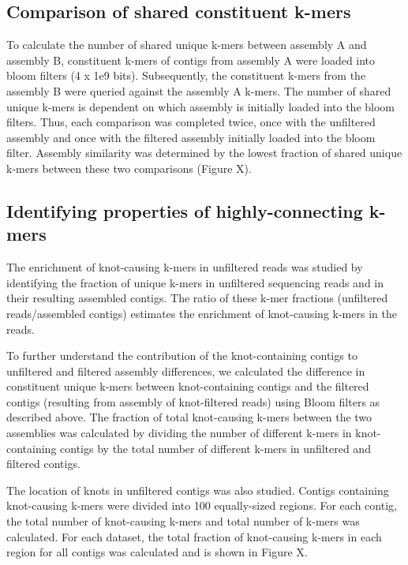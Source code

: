 \documentclass[11pt]{article} %
\begin{document}
\subsection{Comparison of shared constituent k-mers}

To calculate the number of shared unique k-mers between assembly A and assembly B, constituent k-mers of contigs from assembly A were loaded into bloom filters (4 x 1e9 bits). Subsequently, the constituent k-mers from the assembly B were queried against
the assembly A k-mers. The number of shared unique k-mers is
dependent on which assembly is initially loaded into the bloom filters. Thus, each comparison was completed twice, once with the unfiltered
assembly and once with the filtered assembly initially loaded into the bloom
filter. Assembly similarity was determined by the lowest fraction
of shared unique k-mers between these two comparisons (Figure X). 

\subsection{Identifying properties of highly-connecting k-mers}
The enrichment of knot-causing k-mers in unfiltered reads was studied
by identifying the fraction of unique k-mers in unfiltered sequencing
reads and in their resulting assembled contigs. The ratio of these k-mer fractions (unfiltered reads/assembled contigs) estimates the enrichment of knot-causing k-mers in the reads. 

To further understand the contribution of the knot-containing
contigs to unfiltered and filtered assembly differences, we calculated
the difference in constituent unique k-mers between knot-containing
contigs and the filtered contigs (resulting from assembly of knot-filtered reads)
using Bloom filters as described above. The fraction of total knot-causing
k-mers between the two assemblies was calculated by dividing the number
of different k-mers in knot-containing contigs by the total number
of different k-mers in unfiltered and filtered contigs. 

The location of knots in unfiltered contigs was also studied. Contigs containing
knot-causing k-mers were divided into 100 equally-sized regions. For
each contig, the total number of knot-causing k-mers and total number
of k-mers was calculated. For each dataset, the total fraction of
knot-causing k-mers in each region for all contigs was calculated
and is shown in Figure X.
\end{document}
